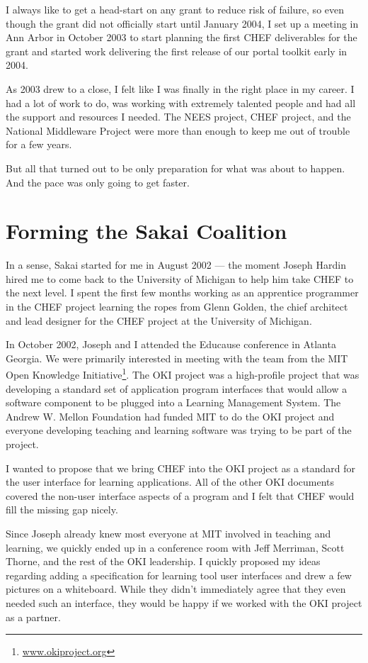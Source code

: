 \documentclass[12pt]{book}
\begin{document}
I always like to get a head-start on any grant to reduce
risk of failure, so even though the grant did not
officially start until January 2004, I set up a meeting
in Ann Arbor in October 2003 to start planning the first CHEF
deliverables for the grant and started work delivering
the first release of our portal toolkit early in
2004.

As 2003 drew to a close, I felt like I was finally in
the right place in my career.  I had a lot of work to
do, was working with extremely talented people
and had all the support and resources I needed.
The NEES project, CHEF project, and the National
Middleware Project were more than
enough to keep me out of trouble for a few years.

But all that turned out to be only preparation for what
was about to happen.  And the pace was only going to
get faster.

\chapter{Forming the Sakai Coalition}

In a sense, Sakai started for me in August 2002 --- the moment Joseph Hardin hired me to
come back to the University of Michigan to help him
take CHEF to the next level.  I spent the first few months working as an
apprentice programmer in the CHEF project learning the ropes from Glenn
Golden, the chief architect and lead designer for the CHEF
project at the University of Michigan.

In October 2002, Joseph and I attended the Educause conference in Atlanta
Georgia.  We were primarily interested in meeting with the team from the
MIT Open Knowledge Initiative\footnote{\url{www.okiproject.org}}.  The OKI project was
a high-profile project that was developing a standard set of
application program interfaces that would allow a software component
to be plugged into a Learning Management System.  The Andrew W. Mellon Foundation
had funded MIT to do the OKI project and everyone developing teaching and learning
software was trying to be part of the project.

I wanted to propose that we bring CHEF into the OKI project as a standard
for the user interface for learning applications.  All of the other OKI
documents covered the non-user interface aspects of a program and I felt
that CHEF would fill the missing gap nicely.

Since Joseph already knew most everyone at MIT involved in teaching and learning,
we quickly ended up in a conference room with Jeff Merriman, Scott Thorne, and
the rest of the OKI leadership.  I quickly proposed my ideas regarding adding a
specification for learning tool user interfaces and drew a few pictures on
a whiteboard.  While they didn't immediately agree that they even needed such
an interface, they would be happy if we worked with the OKI project as a partner.
\end{document}
